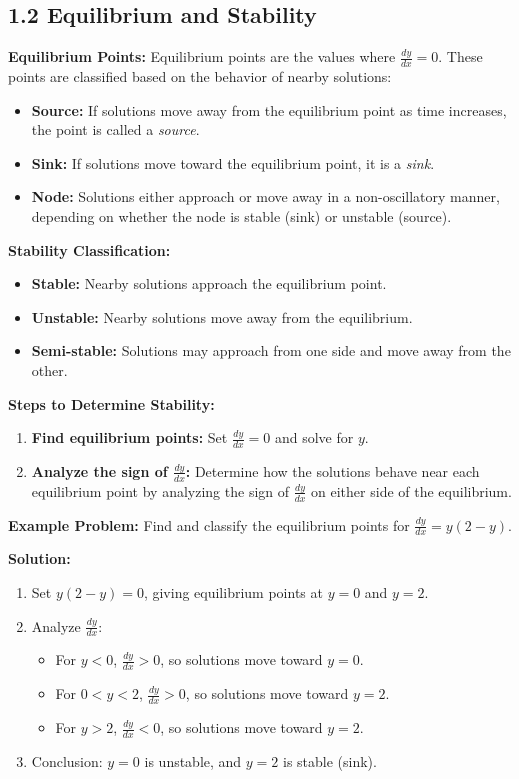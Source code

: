 \documentclass[10pt]{article}
\begin{document}
\subsection*{1.2 Equilibrium and Stability}
\textbf{Equilibrium Points:}
Equilibrium points are the values where \( \frac{dy}{dx} = 0 \). These points are classified based on the behavior of nearby solutions:
\begin{itemize}
    \item \textbf{Source:} If solutions move away from the equilibrium point as time increases, the point is called a \textit{source}.
    \item \textbf{Sink:} If solutions move toward the equilibrium point, it is a \textit{sink}.
    \item \textbf{Node:} Solutions either approach or move away in a non-oscillatory manner, depending on whether the node is stable (sink) or unstable (source).
\end{itemize}

\textbf{Stability Classification:}
\begin{itemize}
    \item \textbf{Stable:} Nearby solutions approach the equilibrium point.
    \item \textbf{Unstable:} Nearby solutions move away from the equilibrium.
    \item \textbf{Semi-stable:} Solutions may approach from one side and move away from the other.
\end{itemize}

\textbf{Steps to Determine Stability:}
\begin{enumerate}
    \item \textbf{Find equilibrium points:} Set \( \frac{dy}{dx} = 0 \) and solve for \( y \).
    \item \textbf{Analyze the sign of \( \frac{dy}{dx} \):} Determine how the solutions behave near each equilibrium point by analyzing the sign of \( \frac{dy}{dx} \) on either side of the equilibrium.
\end{enumerate}

\textbf{Example Problem:} Find and classify the equilibrium points for \( \frac{dy}{dx} = y(2 - y) \).

\textbf{Solution:}
\begin{enumerate}
    \item Set \( y(2 - y) = 0 \), giving equilibrium points at \( y = 0 \) and \( y = 2 \).
    \item Analyze \( \frac{dy}{dx} \):
    \begin{itemize}
        \item For \( y < 0 \), \( \frac{dy}{dx} > 0 \), so solutions move toward \( y = 0 \).
        \item For \( 0 < y < 2 \), \( \frac{dy}{dx} > 0 \), so solutions move toward \( y = 2 \).
        \item For \( y > 2 \), \( \frac{dy}{dx} < 0 \), so solutions move toward \( y = 2 \).
    \end{itemize}
    \item Conclusion: \( y = 0 \) is unstable, and \( y = 2 \) is stable (sink).
\end{enumerate}
\end{document}
